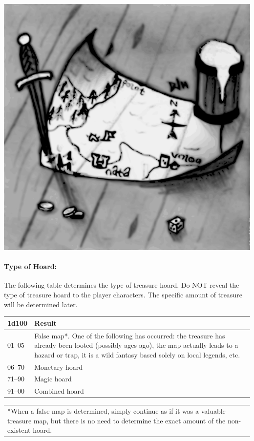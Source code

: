 \begin{multicols}{2}
\noindent \includegraphics[width=\columnwidth]{treasuremap.pdf}\label{unionmap}

\paragraph{Type of Hoard:} The following table determines the type of treasure hoard.  Do NOT reveal the type of treasure hoard to the player characters.  The specific amount of treasure will be determined later.

\noindent
\begin{minipage}{\columnwidth}

\label{typeofhoard}
\noindent
\begin{tabular}{|p{}|p{}|}
\hline
1d100	& Result\\
\hline\hline
\rowcolor[gray]{.9}01--05	& False map*.  One of the following has occurred: the treasure has already been looted (possibly ages ago), the map actually leads to a hazard or trap, it is a wild fantasy based solely on local legends, etc. \\
06--70	& Monetary hoard \\
\rowcolor[gray]{.9}71--90	& Magic hoard \\
91--00	& Combined hoard \\
\hline
\end{tabular}
\noindent\begin{tabular}{p{}}
*When a false map is determined, simply continue as if it was a valuable treasure map, but there is no need to determine the exact amount of the non-existent hoard. \\
\end{tabular}\vspace{.5em}


\end{minipage}
\end{multicols}
